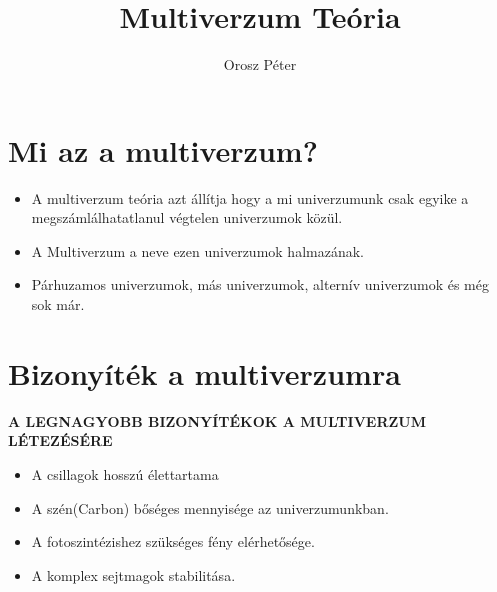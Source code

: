 \documentclass[11pt]{beamer}
\author{Orosz Péter}
\title{Multiverzum Teória}
\institute{Miskolci Egyetem}
\begin{document}
	\begin{frame}
		\titlepage
	\end{frame}

	\begin{frame}
		\tableofcontents
	\end{frame}

	\section{Mi az a multiverzum?}
	\transdissolve
	\begin{frame}
		\begin{itemize}
			\item<1-> A multiverzum teória azt állítja hogy a mi univerzumunk csak egyike a megszámlálhatatlanul végtelen univerzumok közül.
			\item<2-> A Multiverzum a neve ezen univerzumok halmazának.
			\item<3-> Párhuzamos univerzumok, más univerzumok, alternív univerzumok és még sok már.
		\end{itemize}
	\end{frame}
	
	\section{Bizonyíték a multiverzumra}
	\transdissolve
	\begin{frame}
		\begin{multicols}{2}
			\begin{flushright}
				\Large \textbf{A LEGNAGYOBB BIZONYÍTÉKOK A MULTIVERZUM LÉTEZÉSÉRE}
			\end{flushright}
			\vfill\null
			\columnbreak
			\begin{itemize}
				\item<1-> \small A csillagok hosszú élettartama
				\item<2-> \small A szén(Carbon) bőséges mennyisége az univerzumunkban.
				\item<3-> \small A fotoszintézishez szükséges fény elérhetősége.
				\item<4-> \small A komplex sejtmagok stabilitása.
			\end{itemize}
		\end{multicols}
	\end{frame}
	
\end{document}
